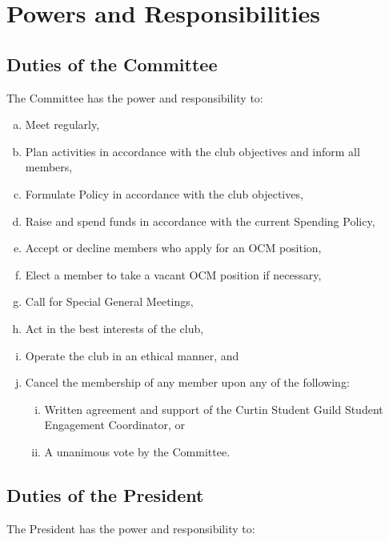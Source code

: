 \documentclass[a4paper,12pt]{article}
\begin{document}
\section{Powers and Responsibilities}

\subsection{Duties of the Committee}

The Committee has the power and responsibility to:

\begin{enumerate}[a)]
	\item Meet regularly,
	\item Plan activities in accordance with the club objectives and inform all members,
	\item Formulate Policy in accordance with the club objectives,
	\item Raise and spend funds in accordance with the current Spending Policy,
	\item Accept or decline members who apply for an OCM position,
	\item Elect a member to take a vacant OCM position if necessary,
	\item Call for Special General Meetings,
	\item Act in the best interests of the club,
	\item Operate the club in an ethical manner, and
	\item Cancel the membership of any member upon any of the following:
	\begin{enumerate}[i)]
		\item Written agreement and support of the Curtin Student Guild Student Engagement Coordinator, or
		\item A unanimous vote by the Committee.
	\end{enumerate}
\end{enumerate}

\subsection{Duties of the President}

The President has the power and responsibility to:
\end{document}
